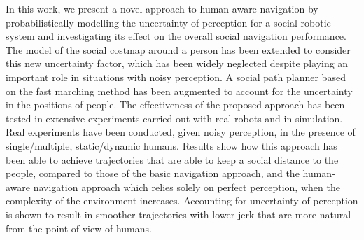 In this work, we present a novel approach to human-aware navigation by probabilistically modelling the uncertainty of perception for a social robotic system and investigating its effect on the overall social navigation performance. The %
model of the social costmap around a person has been extended to consider this new uncertainty factor, which has been widely neglected despite playing an important role in situations with noisy perception. A social path planner based on the fast marching method has been augmented to account for the uncertainty in the positions of people.
The effectiveness of the proposed approach has been tested in extensive experiments carried out with real robots and in simulation. Real experiments have been conducted, given noisy perception, in the presence of single/multiple, static/dynamic humans. Results show how this approach has been able to achieve trajectories that are able to keep a social distance to the people, compared to those of the basic navigation approach, and the human-aware navigation approach which relies solely on perfect perception, when the complexity of the environment increases. 
Accounting for uncertainty of perception is shown to result in smoother trajectories with lower jerk that are more natural from the point of view of humans. 


